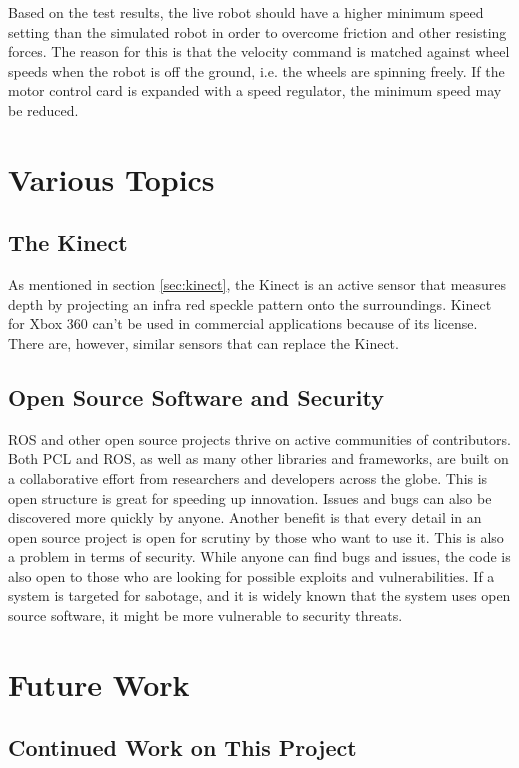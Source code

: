 Based on the test results, the live robot should have a higher minimum speed setting than the simulated robot in order to overcome friction and other resisting forces. The reason for this is that the velocity command is matched against wheel speeds when the robot is off the ground, i.e. the wheels are spinning freely. If the motor control card is expanded with a speed regulator, the minimum speed may be reduced.

\section{Various Topics}

\subsection{The Kinect}

As mentioned in section \ref{sec:kinect}, the Kinect is an active sensor that measures depth by projecting an infra red speckle pattern onto the surroundings.  Kinect for Xbox 360 can't be used in commercial applications because of its license. There are, however, similar sensors that can replace the Kinect.

\subsection{Open Source Software and Security}

\ac{ROS} and other open source projects thrive on active communities of contributors. Both \ac{PCL} and \ac{ROS}, as well as many other libraries and frameworks, are built on a collaborative effort from researchers and developers across the globe. This is open structure is great for speeding up innovation. Issues and bugs can also be discovered more quickly by anyone. Another benefit is that every detail in an open source project is open for scrutiny by those who want to use it. This is also a problem in terms of security. While anyone can find bugs and issues, the code is also open to those who are looking for possible exploits and vulnerabilities. If a system is targeted for sabotage, and it is widely known that the system uses open source software, it might be more vulnerable to security threats.

\section{Future Work}

\subsection{Continued Work on This Project}

